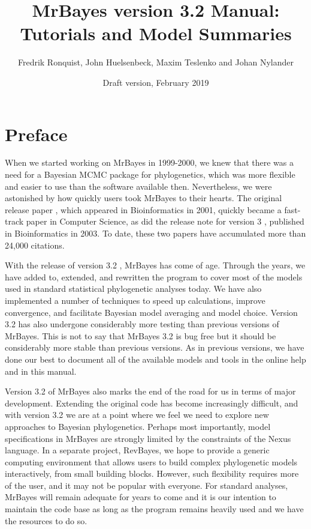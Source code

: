 \documentclass[12pt]{book}
\begin{document}
\title{MrBayes version 3.2 Manual: Tutorials and Model Summaries}

\date{\large Draft version, February 2019}

\author{Fredrik Ronquist, John Huelsenbeck, Maxim Teslenko and Johan Nylander}

\maketitle

\tableofcontents

\newpage

\frontmatter

\chapter{Preface}
\label{preface}

When we started working on MrBayes in 1999-2000, we knew that there was a need
for a Bayesian MCMC package for phylogenetics, which was more flexible and easier to use than the
software available then. Nevertheless, we were astonished by how quickly users took MrBayes
to their hearts. The original release paper \citep{huelsenbeck01c}, which appeared in Bioinformatics
in 2001, quickly became a fast-track paper in Computer Science, as did the release note for
version 3  \citep{ronquist03}, published in Bioinformatics in 2003. To date, these
two papers have accumulated more than 24,000 citations.

With the release of version 3.2 \citep{ronquist11}, MrBayes has come of age. Through
the years, we have added to, extended, and rewritten the program to cover most of the models used
in standard statistical phylogenetic analyses today. We have also implemented a number of techniques
to speed up calculations, improve convergence, and facilitate Bayesian model averaging and model
choice. Version 3.2 has also undergone considerably more testing than previous versions of MrBayes.
This is not to say that MrBayes 3.2 is bug free but it should be considerably more stable than previous
versions. As in previous versions, we have done our best to document all of the available models and
tools in the online help and in this manual. 

Version 3.2 of MrBayes also marks the end of the road for us in terms of major development.
Extending the original code has become increasingly difficult, and with version 3.2 we are at a point
where we feel we need to explore new approaches to Bayesian phylogenetics. Perhaps most importantly,
model specifications in MrBayes are strongly limited by the constraints of the Nexus language. In a
separate project, RevBayes, we hope to provide a generic computing environment that allows users to
build complex phylogenetic models interactively, from small building blocks. However, such flexibility
requires more of the user, and it may not be popular with everyone. For standard analyses, MrBayes
will remain adequate for years to come and it is our intention to maintain the code base as long as
the program remains heavily used and we have the resources to do so.
\end{document}
